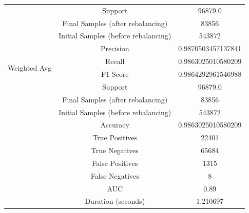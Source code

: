 \begin{longtable}{|c|c|c|}
 & Support & 96879.0 \\
 & Final Samples (after rebalancing) & 83856 \\
 & Initial Samples (before rebalancing) & 543872 \\
\hline
\multirow{4}{*}{Weighted Avg} & Precision & 0.9870503457137841 \\
 & Recall & 0.9863025010580209 \\
 & F1 Score & 0.9864292961546988 \\
 & Support & 96879.0 \\
 & Final Samples (after rebalancing) & 83856 \\
 & Initial Samples (before rebalancing) & 543872 \\
\hline
& Accuracy & 0.9863025010580209 \\ \hline
& True Positives & 22401 \\ \hline
& True Negatives & 65684 \\ \hline
& False Positives & 1315 \\ \hline
& False Negatives & 8 \\ \hline
& AUC & 0.89 \\ \hline
& Duration (seconds) & 1.210697 \\ \hline
\end{longtable}


